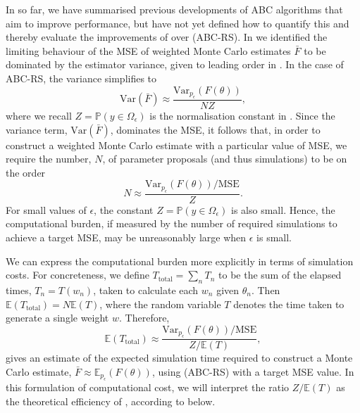\documentclass[review,demo]{siamonline190516}
\begin{document}
In  so far, we have summarised previous developments of ABC algorithms that aim to improve performance, but have not yet defined how to quantify this and thereby evaluate the improvements of  over  (ABC-RS).
In  we identified the limiting behaviour of the MSE of weighted Monte Carlo estimates $\bar F$ to be dominated by the estimator variance, given to leading order in .
In the case of ABC-RS, the variance simplifies to
\begin{equation}
\label{eq:ABCRSVariance}
\mathrm{Var} \left( \bar F \right) 
\approx
\frac{\mathrm{Var}_{p_\epsilon} (F(\theta))}{NZ},
\end{equation}
where we recall $Z = \mathbb P(y \in \Omega_\epsilon)$ is the normalisation constant in .
Since the variance term, $\mathrm{Var} \left( \bar F \right)$, dominates the MSE, it follows that, in order to construct a weighted Monte Carlo estimate with a particular value of MSE, we require the number, $N$, of parameter proposals (and thus simulations) to be on the order
\[
N \approx \frac{\mathrm{Var}_{p_\epsilon} (F(\theta)) / \mathrm{MSE} }{Z}.
\]
For small values of $\epsilon$, the constant $Z = \mathbb P(y \in \Omega_\epsilon)$ is also small. 
Hence, the computational burden, if measured by the number of required simulations to achieve a target MSE, may be unreasonably large when $\epsilon$ is small.

We can express the computational burden more explicitly in terms of simulation costs.
For concreteness, we define $T_{\mathrm{total}} = \sum_n T_n$ to be the sum of the elapsed times, $T_n = T(w_n)$, taken to calculate each $w_n$ given $\theta_n$.
Then $\mathbb E(T_{\mathrm{total}}) = N \mathbb E(T)$, where the random variable $T$ denotes the time taken to generate a single weight $w$.
Therefore,
\[
\mathbb E(T_{\mathrm{total}}) 
\approx
\frac{\mathrm{Var}_{p_\epsilon} (F(\theta)) / \mathrm{MSE} }{Z / \mathbb E(T)},
\]
gives an estimate of the expected simulation time required to construct a Monte Carlo estimate, $\bar F \approx \mathbb E_{p_\epsilon}(F(\theta))$, using  (ABC-RS) with a target MSE value.
In this formulation of computational cost, we will interpret the ratio $Z/\mathbb E(T)$ as the theoretical efficiency of , according to  below.
\end{document}
